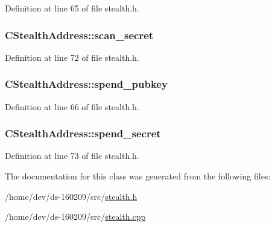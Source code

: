 Definition at line 65 of file stealth.\+h.

\hypertarget{class_c_stealth_address_a0f2033aa89023f33da354a7652e128a3}{}
\subsubsection[{scan\+\_\+secret}]{ C\+Stealth\+Address\+::scan\+\_\+secret}\label{class_c_stealth_address_a0f2033aa89023f33da354a7652e128a3}


Definition at line 72 of file stealth.\+h.

\hypertarget{class_c_stealth_address_ac66ac2e04abb7ee90555c702dfa3049c}{}
\subsubsection[{spend\+\_\+pubkey}]{ C\+Stealth\+Address\+::spend\+\_\+pubkey}\label{class_c_stealth_address_ac66ac2e04abb7ee90555c702dfa3049c}


Definition at line 66 of file stealth.\+h.

\hypertarget{class_c_stealth_address_a20697e3fc4e92648a190755cd44ee2ea}{}
\subsubsection[{spend\+\_\+secret}]{ C\+Stealth\+Address\+::spend\+\_\+secret}\label{class_c_stealth_address_a20697e3fc4e92648a190755cd44ee2ea}


Definition at line 73 of file stealth.\+h.



The documentation for this class was generated from the following files\+:\begin{DoxyCompactItemize}
\item 
/home/dev/ds-\/160209/src/\hyperlink{stealth_8h}{stealth.\+h}\item 
/home/dev/ds-\/160209/src/\hyperlink{stealth_8cpp}{stealth.\+cpp}\end{DoxyCompactItemize}
